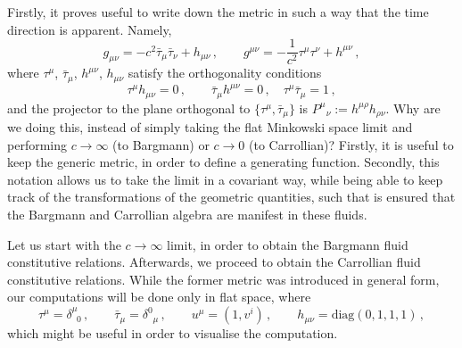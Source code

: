 \documentclass[superscriptaddress,prd,nofootinbib,preprintnumbers,longbibliography,11pt,eqsecnum]{revtex4-1}
\begin{document}
Firstly, it proves useful to write down the metric in such a way that the time direction is apparent. Namely,
\begin{equation}\label{eq:nonrelativisticMetric}
  g_{\mu \nu} = - c^2 \bar\tau_\mu \bar\tau_\nu + h_{\mu \nu} \, , \qquad g^{\mu \nu} = -\frac{1}{c^2}\tau^\mu \tau^\nu+ h^{\mu \nu}\,,
\end{equation}
where $\tau^\mu$, $\bar\tau_\mu$, $h^{\mu \nu}$, $h_{\mu \nu}$ satisfy the orthogonality conditions
\begin{equation}
  \tau^\mu h_{\mu \nu} = 0\, , \qquad \bar\tau_\mu h^{\mu \nu} = 0\, ,\quad \tau^\mu \bar\tau_\mu = 1\,,
\end{equation}
and the projector to the plane orthogonal to $\{\tau^\mu,\bar\tau_\mu\}$ is $P^\mu_{\;\;\, \nu} := h^{\mu \rho} h_{\rho \nu}$. Why are we doing this, instead of simply taking the flat Minkowski space limit and performing $c\to \infty$ (to Bargmann) or $c\to 0$ (to Carrollian)? Firstly, it is useful to keep the generic metric, in order to define a generating function. Secondly, this notation allows us to take the limit in a covariant way, while being able to keep track of the transformations of the geometric quantities, such that is ensured that the Bargmann and Carrollian algebra are manifest in these fluids.

Let us start with the $c\to \infty$ limit, in order to obtain the Bargmann fluid constitutive relations. Afterwards, we proceed to obtain the Carrollian fluid constitutive relations. While the former metric was introduced in general form, our computations will be done only in flat space, where 
\begin{equation}
  \tau^\mu = \delta^\mu_{\;\;0}\, , \qquad \bar\tau_\mu = \delta^0_{\;\;\mu}\, ,\qquad u^\mu = (1,v^i)\, ,\qquad h_{\mu \nu} = \text{diag}(0,1,1,1)\, ,
\end{equation}
which might be useful in order to visualise the computation.
\end{document}
